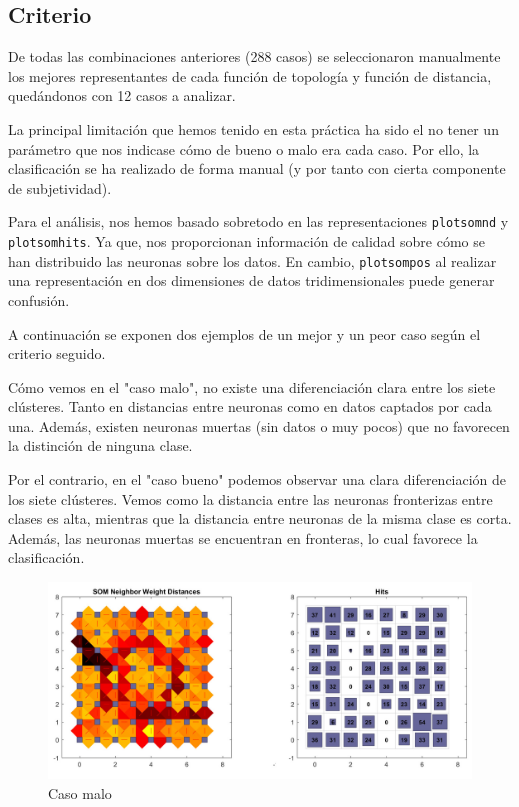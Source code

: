 \documentclass[a4paper,12pt,titlepage]{article}
\begin{document}
\subsection{Criterio}

De todas las combinaciones anteriores (288 casos) se seleccionaron manualmente los mejores representantes de cada función de topología y función de distancia, quedándonos con 12 casos a analizar.

La principal limitación que hemos tenido en esta práctica ha sido el no tener un parámetro que nos indicase cómo de bueno o malo era cada caso. Por ello, la clasificación se ha realizado de forma manual (y por tanto con cierta componente de subjetividad).

Para el análisis, nos hemos basado sobretodo en las representaciones \lstinline|plotsomnd| y \lstinline|plotsomhits|. Ya que, nos proporcionan información de calidad sobre cómo se han distribuido las neuronas sobre los datos. En cambio, \lstinline|plotsompos| al realizar una representación en 
dos dimensiones de datos tridimensionales puede generar confusión.

A continuación se exponen dos ejemplos de un mejor y un peor caso según el criterio seguido. 

Cómo vemos en el "caso malo", no existe una diferenciación clara entre los siete clústeres. Tanto en distancias entre neuronas como en datos captados por cada una. Además, existen neuronas muertas (sin datos o muy pocos) que no favorecen la distinción de ninguna clase.

Por el contrario, en el "caso bueno" podemos observar una clara diferenciación de los siete clústeres. Vemos como la distancia entre las neuronas fronterizas entre clases es alta, mientras que la distancia entre neuronas de la misma clase es corta. Además, las neuronas muertas se encuentran en fronteras, lo cual favorece la clasificación.

\begin{figure}[!ht]
	\centering
	\label{fig:patternnet}
	\includegraphics[width=\textwidth]{caso-malo.jpg}
	\caption{Caso malo}
\end{figure}
\end{document}
